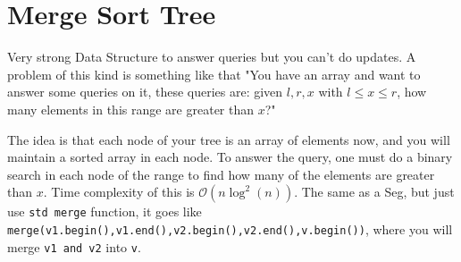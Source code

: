 
    \section{Merge Sort Tree}

    Very strong Data Structure to answer queries but you can't do updates. A problem of this kind is something like that "You have an array and want to answer some queries on it, these queries are: given $l,r,x$ with $l \le x \le r$, how many elements in this range are greater than $x$?"

    The idea is that each node of your tree is an array of elements now, and you will maintain a sorted array in each node. To answer the query, one must do a binary search in each node of the range to find how many of the elements are greater than $x$. Time complexity of this is $\mathcal{O}(n\log^2(n))$. The same as a Seg, but just use \texttt{std merge} function, it goes like \texttt{merge(v1.begin(),v1.end(),v2.begin(),v2.end(),v.begin())}, where you will merge \texttt{v1 and v2} into \texttt{v}.

